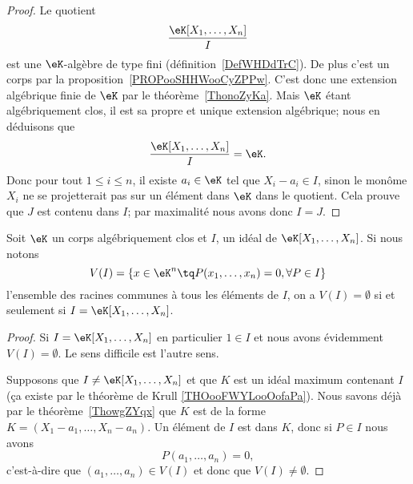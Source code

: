 \begin{proof}
	Le quotient
	\begin{equation}
		\frac{ \eK[X_1,\ldots, X_n] }{ I }
	\end{equation}
	est une \( \eK\)-algèbre de type fini (définition~\ref{DefWHDdTrC}). De plus c'est un corps par la proposition~\ref{PROPooSHHWooCyZPPw}. C'est donc une extension algébrique finie de \( \eK\) par le théorème~\ref{ThonoZyKa}. Mais \( \eK\) étant algébriquement clos, il est sa propre et unique extension algébrique; nous en déduisons que
	\begin{equation}
		\frac{ \eK[X_1,\ldots, X_n] }{ I }=\eK.
	\end{equation}
	Donc pour tout \( 1\leq i\leq n\), il existe \( a_i\in \eK\) tel que \( X_i-a_i\in I\), sinon le monôme \( X_i\) ne se projetterait pas sur un élément dans \( \eK\) dans le quotient. Cela prouve que \( J\) est contenu dans \( I\); par maximalité nous avons donc \( I=J\).
\end{proof}

\begin{corollary}
	Soit \( \eK\) un corps algébriquement clos et \( I\), un idéal de \( \eK[X_1,\ldots, X_n]\). Si nous notons
	\begin{equation}
		V(I)=\{ x\in \eK^n\tq P(x_1,\ldots, x_n)=0,\forall P\in I \}
	\end{equation}
	l'ensemble des racines communes à tous les éléments de \( I\), on a \( V(I)=\emptyset\) si et seulement si \( I=\eK[X_1,\ldots, X_n]\).
\end{corollary}

\begin{proof}
	Si \( I=\eK[X_1,\ldots, X_n]\) en particulier \( 1\in I\) et nous avons évidemment \( V(I)=\emptyset\). Le sens difficile est l'autre sens.

	Supposons que \( I\neq \eK[X_1,\ldots, X_n]\) et que \( K\) est un idéal maximum contenant \( I\) (ça existe par le théorème de Krull \ref{THOooFWYLooOofaPa}). Nous savons déjà par le théorème~\ref{ThowgZYqx} que \( K\) est de la forme \( K=(X_1-a_1,\ldots, X_n-a_n)\). Un élément de \( I\) est dans \( K\), donc si \( P\in I\) nous avons
	\begin{equation}
		P(a_1,\ldots, a_n)=0,
	\end{equation}
	c'est-à-dire que \( (a_1,\ldots, a_n)\in V(I)\) et donc que \( V(I)\neq \emptyset \).
\end{proof}

